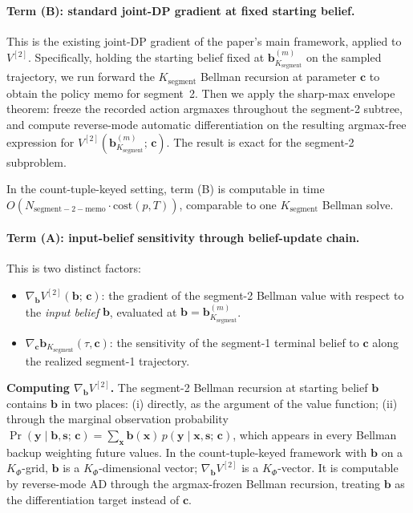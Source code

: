 \documentclass[11pt,a4paper]{article}
\newcommand{\bc}{\bm{c}}
\newcommand{\bx}{\bm{x}}
\newcommand{\by}{\bm{y}}
\newcommand{\bs}{\bm{s}}
\newcommand{\bb}{\bm{b}}
\begin{document}
\paragraph{Term (B): standard joint-DP gradient at fixed starting belief.}

This is the existing joint-DP gradient of the paper's main framework, applied to
$V^{[2]}$.  Specifically, holding the starting belief fixed at $\bb_{K_\mathrm{segment}}^{(m)}$
on the sampled trajectory, we run forward the $K_\mathrm{segment}$ Bellman recursion at
parameter $\bc$ to obtain the policy memo for segment~2.  Then we apply the sharp-max
envelope theorem: freeze the recorded action argmaxes throughout the segment-2 subtree, and
compute reverse-mode automatic differentiation on the resulting argmax-free expression for
$V^{[2]}(\bb_{K_\mathrm{segment}}^{(m)};\, \bc)$.  The result is exact for the segment-2
subproblem.

In the count-tuple-keyed setting, term (B) is computable in time $O(N_\mathrm{segment-2-memo} \cdot \mathrm{cost}(p, T))$, comparable to one $K_\mathrm{segment}$ Bellman solve.

\paragraph{Term (A): input-belief sensitivity through belief-update chain.}

This is two distinct factors:
\begin{itemize}[nosep, leftmargin=2em]
\item $\nabla_{\bb} V^{[2]}(\bb;\, \bc)$: the gradient of the segment-2 Bellman value with
      respect to the \emph{input belief} $\bb$, evaluated at $\bb = \bb_{K_\mathrm{segment}}^{(m)}$.
\item $\nabla_{\bc} \bb_{K_\mathrm{segment}}(\tau, \bc)$: the sensitivity of the segment-1
      terminal belief to $\bc$ along the realized segment-1 trajectory.
\end{itemize}

\textbf{Computing $\nabla_{\bb} V^{[2]}$.}  The segment-2 Bellman recursion at starting
belief $\bb$ contains $\bb$ in two places: (i) directly, as the argument of the value
function; (ii) through the marginal observation probability $\Pr(\by \mid \bb, \bs;\, \bc) =
\sum_{\bx} \bb(\bx)\, p(\by \mid \bx, \bs;\, \bc)$, which appears in every Bellman backup
weighting future values.  In the count-tuple-keyed framework with $\bb$ on a $K_\Phi$-grid,
$\bb$ is a $K_\Phi$-dimensional vector; $\nabla_{\bb} V^{[2]}$ is a $K_\Phi$-vector.  It is
computable by reverse-mode AD through the argmax-frozen Bellman recursion, treating $\bb$
as the differentiation target instead of $\bc$.
\end{document}
